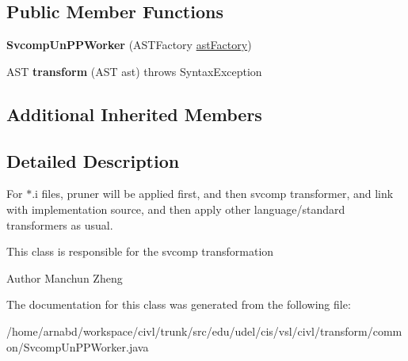 \subsection*{Public Member Functions}
\begin{DoxyCompactItemize}
\item 
\hypertarget{classedu_1_1udel_1_1cis_1_1vsl_1_1civl_1_1transform_1_1common_1_1SvcompUnPPWorker_aae2cb1162e73cbd3be62324a4f10863f}{}{\bfseries Svcomp\+Un\+P\+P\+Worker} (A\+S\+T\+Factory \hyperlink{classedu_1_1udel_1_1cis_1_1vsl_1_1civl_1_1transform_1_1common_1_1BaseWorker_a44812bb476e4511fb6ca29a808427186}{ast\+Factory})\label{classedu_1_1udel_1_1cis_1_1vsl_1_1civl_1_1transform_1_1common_1_1SvcompUnPPWorker_aae2cb1162e73cbd3be62324a4f10863f}

\item 
\hypertarget{classedu_1_1udel_1_1cis_1_1vsl_1_1civl_1_1transform_1_1common_1_1SvcompUnPPWorker_ae0b24e2d74b80162a84c54b050da66d4}{}A\+S\+T {\bfseries transform} (A\+S\+T ast)  throws Syntax\+Exception \label{classedu_1_1udel_1_1cis_1_1vsl_1_1civl_1_1transform_1_1common_1_1SvcompUnPPWorker_ae0b24e2d74b80162a84c54b050da66d4}

\end{DoxyCompactItemize}
\subsection*{Additional Inherited Members}


\subsection{Detailed Description}
For $\ast$.i files, pruner will be applied first, and then svcomp transformer, and link with implementation source, and then apply other language/standard transformers as usual. 

This class is responsible for the svcomp transformation

\begin{DoxyAuthor}{Author}
Manchun Zheng 
\end{DoxyAuthor}


The documentation for this class was generated from the following file\+:\begin{DoxyCompactItemize}
\item 
/home/arnabd/workspace/civl/trunk/src/edu/udel/cis/vsl/civl/transform/common/Svcomp\+Un\+P\+P\+Worker.\+java\end{DoxyCompactItemize}
